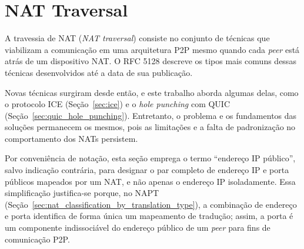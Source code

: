 \section{NAT Traversal}
\label{sec:nat_traversal}

A travessia de NAT (\textit{NAT traversal}) consiste no conjunto de técnicas que viabilizam a comunicação em uma arquitetura P2P mesmo quando cada \textit{peer} está atrás de um dispositivo NAT. O RFC 5128 \citep{rfc5128} descreve os tipos mais comuns dessas técnicas desenvolvidos até a data de sua publicação.

Novas técnicas surgiram desde então, e este trabalho aborda algumas delas, como o protocolo ICE (Seção~\ref{sec:ice}) e o \textit{hole punching} com QUIC (Seção~\ref{sec:quic_hole_punching}). Entretanto, o problema e os fundamentos das soluções permanecem os mesmos, pois as limitações e a falta de padronização no comportamento dos NATs persistem.

Por conveniência de notação, esta seção emprega o termo ``endereço IP público'', salvo indicação contrária, para designar o par completo de endereço IP e porta públicos mapeados por um NAT, e não apenas o endereço IP isoladamente. Essa simplificação justifica-se porque, no NAPT (Seção~\ref{sec:nat_classification_by_translation_type}), a combinação de endereço e porta identifica de forma única um mapeamento de tradução; assim, a porta é um componente indissociável do endereço público de um \textit{peer} para fins de comunicação P2P.

